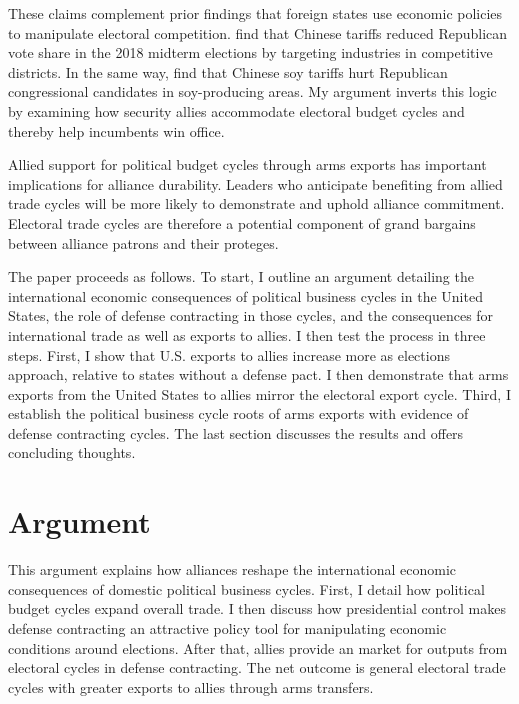 \documentclass[12pt]{article}
\begin{document}
These claims complement prior findings that foreign states use economic policies to manipulate electoral competition. 
\citet{KimMargalit2021} find that Chinese tariffs reduced Republican vote share in the 2018 midterm elections by targeting industries in competitive districts.
In the same way, \citet{ChyzhUrbatsch2021} find that Chinese soy tariffs hurt Republican congressional candidates in soy-producing areas. 
My argument inverts this logic by examining how security allies accommodate electoral budget cycles and thereby help incumbents win office. 


Allied support for political budget cycles through arms exports has important implications for alliance durability. 
Leaders who anticipate benefiting from allied trade cycles will be more likely to demonstrate and uphold alliance commitment. 
Electoral trade cycles are therefore a potential component of grand bargains between alliance patrons and their proteges. 


The paper proceeds as follows. 
To start, I outline an argument detailing the international economic consequences of political business cycles in the United States, the role of defense contracting in those cycles, and the consequences for international trade as well as exports to allies.
I then test the process in three steps. 
First, I show that U.S. exports to allies increase more as elections approach, relative to states without a defense pact. 
I then demonstrate that arms exports from the United States to allies mirror the electoral export cycle.
Third, I establish the political business cycle roots of arms exports with evidence of defense contracting cycles.
The last section discusses the results and offers concluding thoughts.


\section{Argument}


This argument explains how alliances reshape the international economic consequences of domestic political business cycles. 
First, I detail how political budget cycles expand overall trade.
I then discuss how presidential control makes defense contracting an attractive policy tool for manipulating economic conditions around elections. 
After that, allies provide an market for outputs from electoral cycles in defense contracting. 
The net outcome is general electoral trade cycles with greater exports to allies through arms transfers. 
\end{document}
